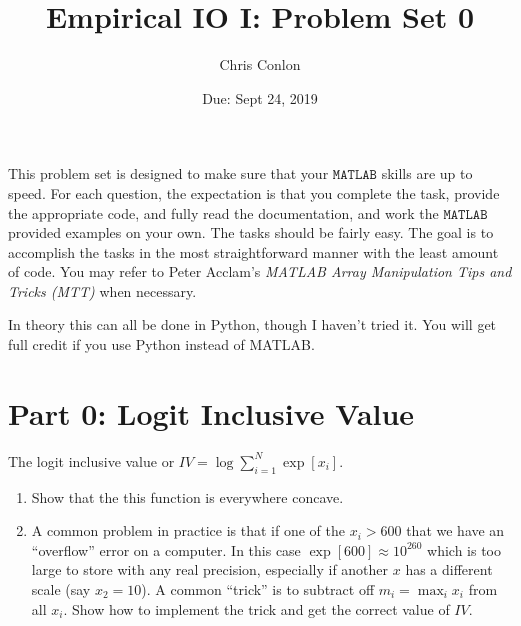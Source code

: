 \documentclass{article}
\begin{document}
\title{Empirical IO I: Problem Set 0}
\author{Chris Conlon}
\date{Due: Sept 24, 2019}
\maketitle
This problem set is designed to make sure that your $\mathtt{MATLAB}$ skills are up to speed. For each question, the expectation is that you complete the task, provide the appropriate code, and fully read the documentation, and work the $\mathtt{MATLAB}$ provided examples on your own.  The tasks should be fairly easy.  The goal is to accomplish the tasks in the most straightforward manner with the least amount of code.  You may refer to Peter Acclam's \emph{MATLAB Array Manipulation Tips and Tricks (MTT)} when necessary.

In theory this can all be done in Python, though I haven't tried it. You will get full credit if you use Python instead of MATLAB.


\section*{Part 0: Logit Inclusive Value}
The logit inclusive value or $IV = \log \sum_{i=1}^N \exp[x_i]$.
\begin{enumerate}
\item Show that the this function is everywhere concave.
\item A common problem in practice is that if one of the $x_i > 600$ that we have an ``overflow'' error on a computer. In this case $\exp[600] \approx 10^{260}$ which is too large to store with any real precision, especially if another $x$ has a different scale (say $x_2=10$). A common ``trick'' is to subtract off $m_i = \max_i x_i$ from all $x_i$.  Show how to implement the trick and get the correct value of $IV$.
\end{enumerate}
\end{document}
